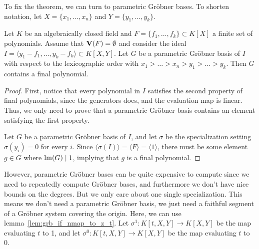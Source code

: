 To fix the theorem, we can turn to parametric Gröbner bases. To shorten notation, let $X = \{x_{1}, \dots, x_{n}\}$ and $Y = \{y_{1}, \dots, y_{k}\}$.

\begin{theorem}
  Let $K$ be an algebraically closed field and $F = \{f_{1}, \dots, f_{k}\} \subset K[X]$ a finite set of polynomials. Assume that $\operatorname{\mathbf V}(F) = \emptyset$ and consider the ideal $I = \langle y_{1} - f_{1}, \dots, y_{k} - f_{k} \rangle \subset K[X, Y]$. Let $G$ be a parametric Gröbner basis of $I$ with respect to the lexicographic order with $x_{1} > \dots > x_{n} > y_{1} > \dots > y_{k}$. Then $G$ contains a final polynomial.
\end{theorem}
\begin{proof}
  First, notice that every polynomial in $I$ satisfies the second property of final polynomials, since the generators does, and the evaluation map is linear. Thus, we only need to prove that a parametric Gröbner basis contains an element satisfying the first property.

  Let $G$ be a parametric Gröbner basis of $I$, and let $\sigma$ be the specialization setting $\sigma(y_{i}) = 0$ for every $i$. Since $\langle \sigma(I) \rangle = \langle F \rangle = \langle 1 \rangle$, there must be some element $g \in G$ where $\operatorname{lm}(G) \mid 1$, implying that $g$ is a final polynomial.
\end{proof}

However, parametric Gröbner bases can be quite expensive to compute since we need to repeatedly compute Gröbner bases, and furthermore we don't have nice bounds on the degrees. But we only care about one single specialization. This means we don't need a parametric Gröbner basis, we just need a faithful segment of a Gröbner system covering the origin. Here, we can use lemma~\ref{lem:grb_if_nmap_to_z_t}. Let $\sigma^{1} : K[t, X, Y] \to K[X, Y]$ be the map evaluating $t$ to 1, and let $\sigma^{0} : K[t, X, Y] \to K[X, Y]$ be the map evaluating $t$ to 0.

